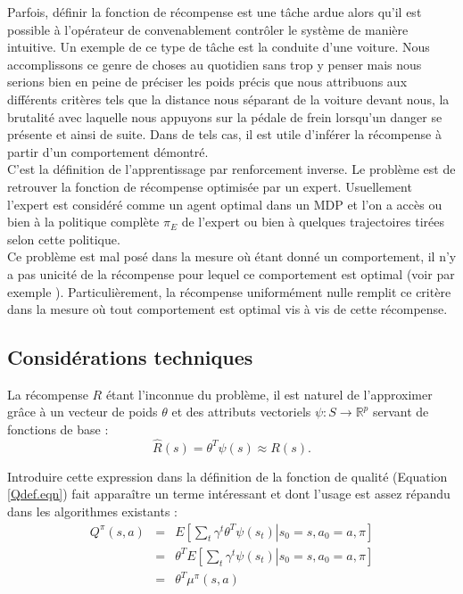 \documentclass[publibook-draft]{CAp2012}
\begin{document}
Parfois, définir la fonction de récompense est une tâche ardue alors qu'il est possible à l'opérateur de convenablement contrôler le système de manière intuitive. Un exemple de ce type de tâche est la conduite d'une voiture. Nous accomplissons ce genre de choses au quotidien sans trop y penser mais nous serions bien en peine de préciser les poids précis que nous attribuons aux différents critères tels que la distance nous séparant de la voiture devant nous, la brutalité avec laquelle nous appuyons sur la pédale de frein lorsqu'un danger se présente et ainsi de suite. Dans de tels cas, il est utile d'inférer la récompense à partir d'un comportement démontré.\\

C'est la définition de l'apprentissage par renforcement inverse. Le problème est de retrouver la fonction de récompense optimisée par un expert. Usuellement l'expert est considéré comme un agent optimal dans un MDP et l'on a accès ou bien à la politique complète $\pi_E$ de l'expert ou bien à quelques trajectoires tirées selon cette politique.\\

Ce problème est mal posé dans la mesure où étant donné un comportement, il n'y a pas unicité de la récompense pour lequel ce comportement est optimal (voir par exemple \cite{ng1999policy}). Particulièrement, la récompense uniformément nulle remplit ce critère dans la mesure où tout comportement est optimal vis à vis de cette récompense.
\subsection{Considérations techniques}
\label{ConsiderationsTechniques.sec}
La récompense $R$ étant l'inconnue du problème, il est naturel de l'approximer grâce à un vecteur de poids $\theta$ et des attributs vectoriels $\psi : S\rightarrow \mathbb{R}^p$ servant de fonctions de base :
\begin{equation}
\label{hatRdef.eqn}
\hat R(s) = \theta^T\psi(s)\approx R(s).
\end{equation}

Introduire cette expression dans la définition de la fonction de qualité (Equation \eqref{Qdef.eqn}) fait apparaître un terme intéressant et dont l'usage est assez répandu dans les algorithmes existants :
\begin{eqnarray}
Q^\pi(s,a) &=& E\left[\left.\sum_t\gamma^t\theta^T\psi(s_t)\right|s_0=s,a_0=a,\pi\right]\\
 &=& \theta^TE\left[\left.\sum_t\gamma^t\psi(s_t)\right|s_0=s,a_0=a,\pi\right]\\
 &=& \theta^T\mu^\pi(s,a)
\label{Qmu.eqn}
\end{eqnarray}
\end{document}
